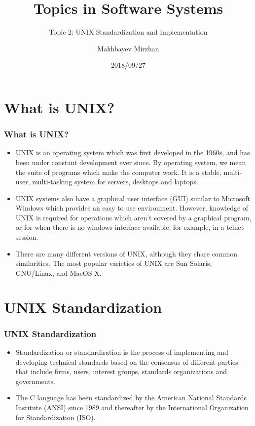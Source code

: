 \documentclass[newPxFont,sthlmFooter,nooffset]{beamer}
\title{Topics in Software Systems}
\subtitle{Topic 2: UNIX Standardization and Implementation}
\author{Makhbayev Mirzhan}
\date{2018/09/27}
\begin{document}
\frame[plain]{\titlepage}




\section{What is UNIX?}

\begin{frame}[t]
  \frametitle{What is UNIX?}
\begin{itemize}
	\item UNIX is an operating system which was first developed in the 1960s, and has been under constant development ever since. By operating system, we mean the suite of programs which make the computer work. It is a stable, multi-user, multi-tasking system for servers, desktops and laptops. 
  \item UNIX systems also have a graphical user interface (GUI) similar to Microsoft Windows which provides an easy to use environment. However, knowledge of UNIX is required for operations which aren't covered by a graphical program, or for when there is no windows interface available, for example, in a telnet session.
  \item There are many different versions of UNIX, although they share common similarities. The most popular varieties of UNIX are Sun Solaris, GNU/Linux, and MacOS X. 
\end{itemize}
    
\end{frame}

\section{UNIX Standardization}
	\begin{frame}[t]
  	\frametitle{UNIX Standardization}
	\begin{itemize}
		\item Standardization or standardisation is the process of implementing and developing technical standards based on the consensus of different parties that include firms, users, interest groups, standards organizations and governments.
		\item The C language has been standardized by the American National Standards Institute (ANSI) since 1989 and thereafter by the International Organization for Standardization (ISO).
	\end{itemize}
	\end{frame}
\end{document}
